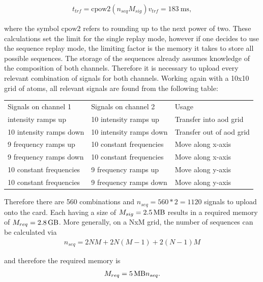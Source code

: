 \begin{align}
	t_{trf} = \textrm{cpow2}(n_{seq} M_{sig}) v_{trf} = \SI{183}{\milli\second},
\end{align}

where the symbol $\textrm{cpow2}$ refers to rounding up to the next power of two.
These calculations set the limit for the single replay mode, however if one decides to use the sequence replay mode, the limiting factor is the memory it takes to store all possible sequences. The storage of the sequences already assumes knowledge of the composition of both channels. Therefore it is necessary to upload every relevant combination of signals for both channels. Working again with a 10x10 grid of atoms, all relevant signals are found from the following table:

\begin{table}[h!]
\label{tbl:eom_crystals}
\centering
\begin{tabular}{l|l|l}
	\hline \hline
		Signals on channel 1 & Signals on channel 2 & Usage \\ \thickhline
		10 intensity ramps up & 10 intensity ramps up & Transfer into \ac{aod} grid \\
		10 intensity ramps down & 10 intensity ramps down & Transfer out of \ac{aod} grid \\
		9 frequency ramps up & 10 constant frequencies & Move along x-axis \\
		9 frequency ramps down & 10 constant frequencies & Move along x-axis \\
		10 constant frequencies & 9 frequency ramps up & Move along y-axis \\
		10 constant frequencies & 9 frequency ramps down & Move along y-axis \\
	\hline \hline
\end{tabular}
\end{table}

Therefore there are 560 combinations and $n_{seq} = 560*2=1120$ signals to upload onto the card. Each having a size of $M_{sig} = \SI{2.5}{\mega\byte}$ results in a required memory of $M_{req}=\SI{2.8}{\giga\byte}$. More generally, on a NxM grid, the number of sequences can be calculated via
\begin{align}
	n_{seq} = 2 N M + 2 N (M-1) + 2 (N-1) M
\end{align}

and therefore the required memory is
\begin{align}
	M_{req} = \SI{5}{\mega\byte} n_{seq}.
\end{align}

